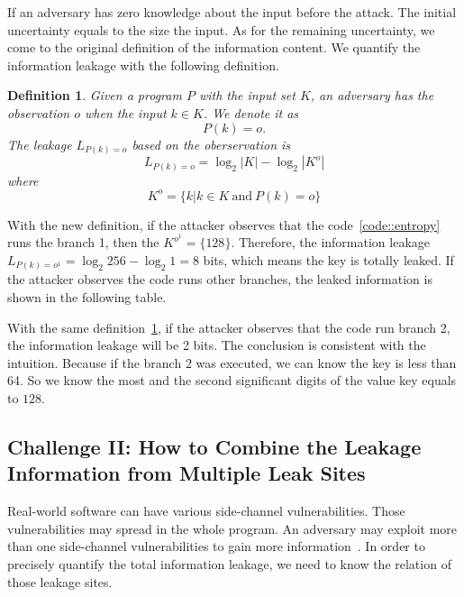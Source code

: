 If an adversary has zero knowledge about the input before the attack. The initial uncertainty
equals to the size the input. As for the remaining uncertainty, we come to the original definition
of the information content.
We quantify the information leakage with the following definition. 

\newtheorem{mydef}{Definition}

\begin{mydef}
\label{def}
Given a program $P$ with the input set $K$, 
an adversary has the observation $o$ when the input $k{\in}K$. 
We denote it as
    $$P(k) = o.$$
The leakage $L_{P(k)=o}$ based on the oberservation is
    $$L_{P(k)=o} = \log_2{|K|} - \log_2{|K^o|}$$
    where
    $$K^o = \{k | k \in K \ \text{and} \ P(k) = o \}$$
\end{mydef}

With the new definition, if the attacker observes that the code~\ref{code::entropy} runs the branch 1, 
then the $K^{o^{1}} = \{128\}$. Therefore, the information leakage $L_{P(k)=o^{1}} = \log_2{256} - \log_2{1} = 8$
bits, which means the key is totally leaked. If the attacker observes the code runs other
branches, the leaked information is shown in the following table.

\begin{table}[h]
    \centering
    \caption{The leaked information by the definition~\ref{def}}
\end{table}

With the same definition~\ref{def}, if the attacker observes that the code run branch 2, the information
leakage will be 2 bits. The conclusion is consistent with the intuition. Because if the branch 2 was
executed, we can know the key is less than 64. So we know the most and the second significant digits of 
the value key equals to $128$.

\subsection{Challenge II: How to Combine the Leakage Information from Multiple Leak Sites}
Real-world software can have various side-channel vulnerabilities. Those vulnerabilities 
may spread in the whole program. An adversary may exploit more than one side-channel vulnerabilities 
to gain more information~\cite{7163052, 191010}. In order to precisely quantify the
total information leakage, we need to know the relation of those leakage sites. 


